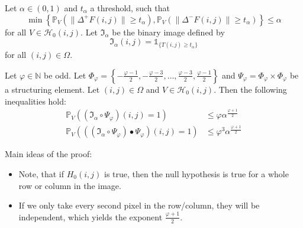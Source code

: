\documentclass[presentation]{beamer}
\newcommand{\norm}[1]{\lVert#1\rVert}
\begin{document}
\begin{frame}
	\begin{theorem}
		Let $\alpha \in (0, 1)$ and $t_\alpha$ a threshold, such that
		\begin{equation*}
			\min \left\{ \mathbb{P}_V\left( \norm{\Delta^+ F(i, j)} \geq t_\alpha \right), \mathbb{P}_V\left( \norm{\Delta^- F(i, j)} \geq t_\alpha \right) \right\} \leq \alpha
		\end{equation*}
		for all $V \in \mathcal{H}_0(i, j)$. \pause Let $\mathfrak{I}_\alpha$ be the binary image defined by
		\begin{equation*}
			\mathfrak{I}_\alpha(i, j) = \mathds{1}_{ \{ T(i, j) \geq t_\alpha \} }
		\end{equation*}
		for all $(i, j) \in \Omega$. \pause
		
		Let $\varphi \in \mathbb{N}$ be odd. Let $\Phi_\varphi = \left\{ -\frac{\varphi - 1}{2}, -\frac{\varphi - 3}{2}, \dots, \frac{\varphi - 3}{2}, \frac{\varphi - 1}{2} \right\}$ and $\Psi_\varphi = \Phi_\varphi \times \Phi_\varphi$ be a structuring element. Let $(i, j) \in \Omega$ and $V \in \mathcal{H}_0(i, j)$. \pause
		Then the following inequalities hold:
		\begin{align}
			\mathbb{P}_V\left( (\mathfrak{I}_\alpha \circ \Psi_\varphi)(i, j) = 1 \right) &\leq \varphi \alpha^{\frac{\varphi + 1}{2}} \\
			\mathbb{P}_V\left( ((\mathfrak{I}_\alpha \circ \Psi_\varphi) \bullet \Psi_\varphi)(i, j) = 1 \right) &\leq \varphi^3 \alpha^{\frac{\varphi + 1}{2}}
		\end{align}
	\end{theorem}
\end{frame}

\begin{frame}
	Main ideas of the proof:
	\begin{itemize}
		\item Note, that if $H_0(i, j)$ is true, then the null hypothesis is true for a whole row or column in the image.
		\item If we only take every second pixel in the row/column, they will be independent, which yields the exponent $\frac{\varphi + 1}{2}$.
	\end{itemize}
\end{frame}
\end{document}
